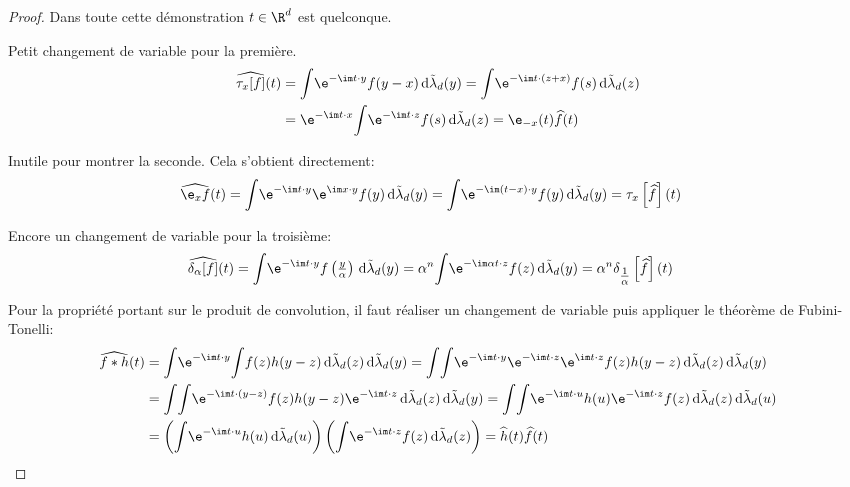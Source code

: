 \begin{proof}
Dans toute cette démonstration $t \in \R^d$ est quelconque.

\medskip
Petit changement de variable pour la première.
\begin{align*}
\widehat{\tau_x[f]}(t) & = \displaystyle{\int} \e^{-\im t \cdot y} f(y-x) \, \mathrm d \tilde{\lambda}_d(y) = \displaystyle{\int} \e^{-\im t \cdot (z+x)} f(s) \, \mathrm d \tilde{\lambda}_d(z) \\
 & = \e^{-\im t \cdot x} \displaystyle{\int} \e^{-\im t \cdot z} f(s) \, \mathrm d \tilde{\lambda}_d(z) = \e_{-x}(t) \widehat{f}(t)
\end{align*}

Inutile pour montrer la seconde. Cela s'obtient directement:
\begin{align*}
\widehat{\e_x f}(t) & = \displaystyle{\int} \e^{-\im t \cdot y} \e^{\im x \cdot y} f(y) \, \mathrm d \tilde{\lambda}_d(y) = \displaystyle{\int} \e^{-\im (t-x) \cdot y} f(y) \, \mathrm d \tilde{\lambda}_d(y) = \tau_x\left [ \widehat{f}\right ](t)
\end{align*}

Encore un changement de variable pour la troisième:
\begin{align*}
\widehat{\delta_{\alpha}[f]}(t) & = \displaystyle{\int} \e^{-\im t \cdot y} f\left (\tfrac{y}{\alpha} \right ) \, \mathrm d \tilde{\lambda}_d(y) = \alpha^n \displaystyle{\int} \e^{-\im \alpha t \cdot z} f(z) \, \mathrm d \tilde{\lambda}_d(y) = \alpha^n \delta_{\tfrac{1}{\alpha}} \left [\widehat{f}\right ] (t)
\end{align*}

Pour la propriété portant sur le produit de convolution, il faut réaliser un changement de variable puis appliquer le théorème de Fubini-Tonelli:
\begin{align*}
\widehat{f*h}(t) & = \displaystyle{\int}  \e^{-\im t \cdot y}  \displaystyle{\int} f(z) h (y-z) \, \mathrm d \tilde{\lambda}_d(z) \, \mathrm d \tilde{\lambda}_d(y) = \displaystyle{\int}\displaystyle{\int}  \e^{-\im t \cdot y} \e^{-\im t \cdot z} \e^{\im t \cdot z}  f(z) h (y-z) \, \mathrm d \tilde{\lambda}_d(z) \, \mathrm d \tilde{\lambda}_d(y) \\
 & = \displaystyle{\int}\displaystyle{\int} \e^{- \im t \cdot (y-z)} f(z) h(y-z)  \e^{-\im t \cdot z} \, \mathrm d \tilde{\lambda}_d(z) \, \mathrm d \tilde{\lambda}_d(y) = \displaystyle{\int}\displaystyle{\int} \e^{- \im t \cdot u} h(u)  \e^{-\im t \cdot z} f(z) \, \mathrm d \tilde{\lambda}_d(z) \, \mathrm d \tilde{\lambda}_d(u) \\
 & = \left (\displaystyle{\int} \e^{- \im t \cdot u} h(u)  \, \mathrm d \tilde{\lambda}_d(u)\right ) \left (\displaystyle{\int} \e^{-\im t \cdot z} f(z) \, \mathrm d \tilde{\lambda}_d(z) \right ) = \widehat{h}(t)  \widehat{f}(t)
\end{align*}


\end{proof}
